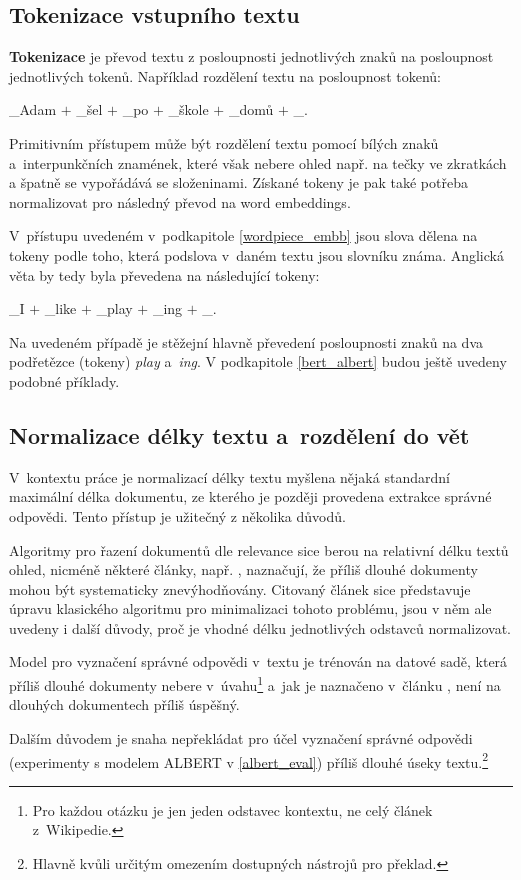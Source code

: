 \subsection{Tokenizace vstupního textu}
\textbf{Tokenizace} je převod textu z posloupnosti jednotlivých znaků na posloupnost jednotlivých tokenů. Například rozdělení textu  na posloupnost tokenů:
\begin{center}
    \_Adam $+$ \_šel $+$ \_po $+$ \_škole $+$ \_domů $+$ \_.
\end{center}
Primitivním přístupem může být rozdělení textu pomocí bílých znaků a~interpunkčních znamének, které však nebere ohled např. na tečky ve zkratkách a špatně se vypořádává se složeninami. Získané tokeny je pak také potřeba normalizovat pro následný převod na word embeddings.\par
V~přístupu uvedeném v~podkapitole \ref{wordpiece_embb} jsou slova dělena na tokeny podle toho, která podslova v~daném textu jsou slovníku známa. Anglická věta  by tedy byla převedena na následující tokeny:
\begin{center}
    \_I $+$ \_like $+$ \_play $+$ \_ing $+$ \_.
\end{center}
Na uvedeném případě je stěžejní hlavně převedení posloupnosti znaků  na dva podřetězce (tokeny) \emph{play} a~\emph{ing}. V podkapitole \ref{bert_albert} budou ještě uvedeny podobné příklady. 

\subsection{Normalizace délky textu a~rozdělení do vět}
V~kontextu práce je normalizací délky textu myšlena nějaká standardní maximální délka dokumentu, ze kterého je později provedena extrakce správné odpovědi. Tento přístup je užitečný z několika důvodů.\par
Algoritmy pro řazení dokumentů dle relevance sice berou na relativní délku textů ohled, nicméně některé články, např. \cite{bm25_too_long}, naznačují, že příliš dlouhé dokumenty mohou být systematicky znevýhodňovány. Citovaný článek sice představuje úpravu klasického algoritmu pro minimalizaci tohoto problému, jsou v něm ale uvedeny i další důvody, proč je vhodné délku jednotlivých odstavců normalizovat.\par
Model pro vyznačení správné odpovědi v~textu je trénován na datové sadě, která příliš dlouhé dokumenty nebere v~úvahu\footnote{Pro každou otázku je jen jeden odstavec kontextu, ne celý článek z~Wikipedie.} a~jak je naznačeno v~článku \cite{QA_long_multiple_span}, není na dlouhých dokumentech příliš úspěšný.\par
Dalším důvodem je snaha nepřekládat pro účel vyznačení správné odpovědi (experimenty s modelem ALBERT v \ref{albert_eval}) příliš dlouhé úseky textu.\footnote{Hlavně kvůli určitým omezením dostupných nástrojů pro překlad.}

